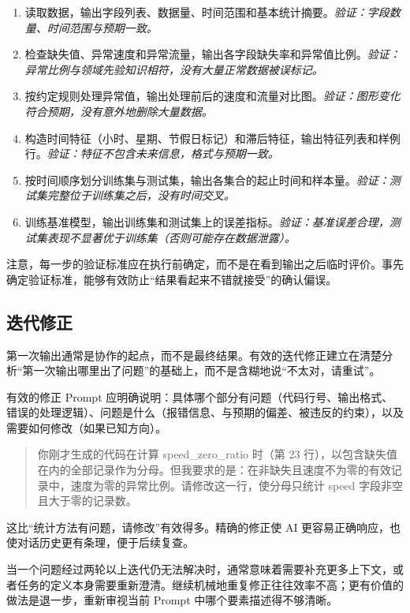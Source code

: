 \begin{enumerate}
  \item 读取数据，输出字段列表、数据量、时间范围和基本统计摘要。\textit{验证：字段数量、时间范围与预期一致。}
  \item 检查缺失值、异常速度和异常流量，输出各字段缺失率和异常值比例。\textit{验证：异常比例与领域先验知识相符，没有大量正常数据被误标记。}
  \item 按约定规则处理异常值，输出处理前后的速度和流量对比图。\textit{验证：图形变化符合预期，没有意外地删除大量数据。}
  \item 构造时间特征（小时、星期、节假日标记）和滞后特征，输出特征列表和样例行。\textit{验证：特征不包含未来信息，格式与预期一致。}
  \item 按时间顺序划分训练集与测试集，输出各集合的起止时间和样本量。\textit{验证：测试集完整位于训练集之后，没有时间交叉。}
  \item 训练基准模型，输出训练集和测试集上的误差指标。\textit{验证：基准误差合理，测试集表现不显著优于训练集（否则可能存在数据泄露）。}
\end{enumerate}

注意，每一步的验证标准应在执行前确定，而不是在看到输出之后临时评价。事先确定验证标准，能够有效防止“结果看起来不错就接受”的确认偏误。

\subsection{迭代修正}

第一次输出通常是协作的起点，而不是最终结果。有效的迭代修正建立在清楚分析“第一次输出哪里出了问题”的基础上，而不是含糊地说“不太对，请重试”。

有效的修正 Prompt 应明确说明：具体哪个部分有问题（代码行号、输出格式、错误的处理逻辑）、问题是什么（报错信息、与预期的偏差、被违反的约束），以及需要如何修改（如果已知方向）。

\begin{quote}
你刚才生成的代码在计算 speed\_zero\_ratio 时（第 23 行），以包含缺失值在内的全部记录作为分母。但我要求的是：在非缺失且速度不为零的有效记录中，速度为零的异常比例。请修改这一行，使分母只统计 speed 字段非空且大于零的记录数。
\end{quote}

这比“统计方法有问题，请修改”有效得多。精确的修正使 AI 更容易正确响应，也使对话历史更有条理，便于后续复查。

当一个问题经过两轮以上迭代仍无法解决时，通常意味着需要补充更多上下文，或者任务的定义本身需要重新澄清。继续机械地重复修正往往效率不高；更有价值的做法是退一步，重新审视当前 Prompt 中哪个要素描述得不够清晰。

